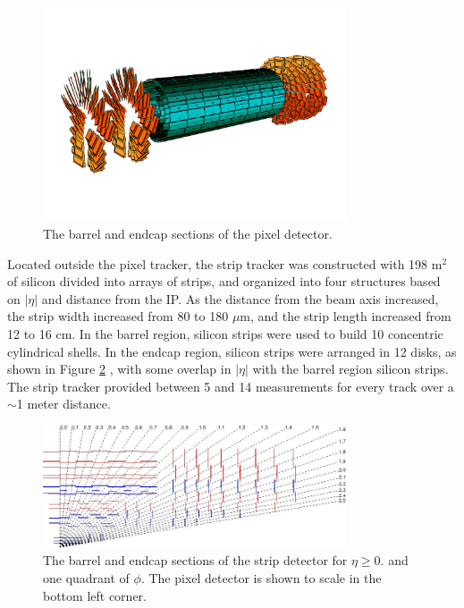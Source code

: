\begin{figure}[ht]
	\centering
	\includegraphics[width=0.8\textwidth]{figures/pixelDetectorSchematic.png}
	\caption{The barrel and endcap sections of the pixel detector.}
	\label{fig:pixelTracker}
\end{figure}

Located outside the pixel tracker, the strip tracker was constructed with 198 m$^{2}$ of silicon divided into arrays of strips, 
and organized into four structures based on $|\eta|$ and distance from the IP.  As the distance from the beam axis increased, the 
strip width increased from 80 to 180 $\mu$m, and the strip length increased from 12 to 16 cm.  
In the barrel region, silicon strips were used to build 10 concentric cylindrical shells.  In the endcap region, silicon 
strips were arranged in 12 disks, as shown in Figure \ref{fig:stripTracker} \cite{cmsTDR}, with some overlap in $|\eta|$ with 
the barrel region silicon strips.  The strip tracker provided between 5 and 14 measurements for every track over a $\sim$1 meter 
distance.

\begin{figure}[ht]
	\centering
	\includegraphics[width=0.8\textwidth]{figures/siliconStripAndPixelDetectorTwoDimView.png}
	\caption{The barrel and endcap sections of the strip detector for $\eta \geq 0.$ and one quadrant of $\phi$.  
	The pixel detector is shown to scale in the bottom left corner.}
	\label{fig:stripTracker}
\end{figure}

